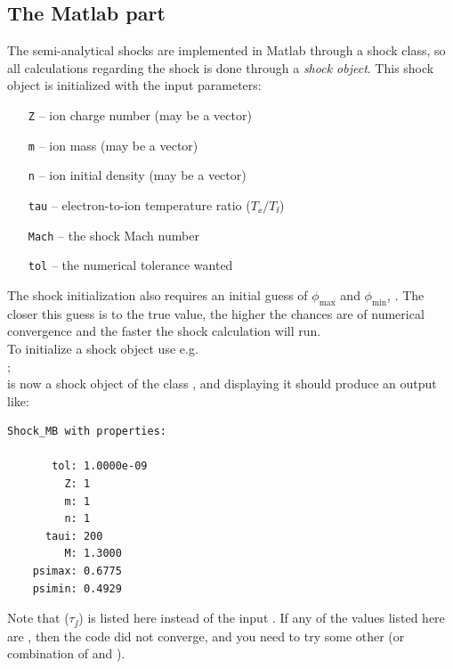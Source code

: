 \documentclass[11pt,a4paper, 
swedish, english %
]{article}
\begin{document}
\subsection{The Matlab part}
The semi-analytical shocks are implemented in Matlab through a shock
class, so all calculations regarding the shock is done through a
\emph{shock object}. This shock object is initialized with the input
parameters:
\begin{itemize}
\item[\texttt{Z} --] ion charge number (may be a vector)
\item[\texttt{m} --] ion mass (may be a vector)
\item[\texttt{n} --] ion initial density (may be a vector)
\item[\texttt{tau} --] electron-to-ion temperature ratio
($T_{\ee}/T_{\ii}$)\footnotemark{}
\item[\texttt{Mach} --] the shock Mach number
\item[\texttt{tol} --] the numerical tolerance wanted
\end{itemize}
The shock initialization also requires an initial guess of
$\phi_{\max}$ and $\phi_{\min}$, . The closer
this guess is to the true value, the higher the chances are of
numerical convergence and the faster the shock calculation will run.
\\
To initialize a shock object use e.g.\\
\indent{};\\
 is now a shock object of the class , and
displaying it should produce an output like:
\vspace{-1em}
\begin{lstlisting}[frame=single]
Shock_MB with properties:

       tol: 1.0000e-09
         Z: 1
         m: 1
         n: 1
      taui: 200
         M: 1.3000
    psimax: 0.6775
    psimin: 0.4929
\end{lstlisting}
Note that  ($\tau_{\jj}$) is listed here instead of the
input . If any of the values listed here are ,
then the code did not converge, and you need to try some other
 (or combination of 
and ). 
 
\end{document}
